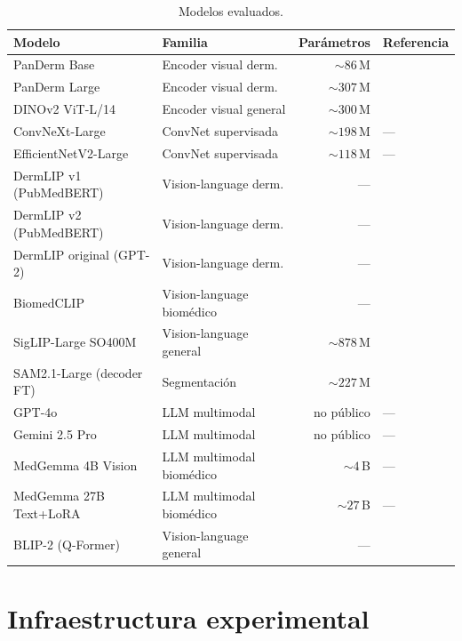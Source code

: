 \begin{table}[htbp]
\centering
\footnotesize
\setlength{\tabcolsep}{4pt}
\renewcommand{\arraystretch}{0.95}
\caption{Modelos evaluados.}
\label{tab:modelos}
\begin{tabular}{llrl}
\hline
Modelo & Familia & Parámetros & Referencia \\
\hline
PanDerm Base                & Encoder visual derm.       & $\sim 86$\,M & \cite{panderm2025} \\
PanDerm Large               & Encoder visual derm.       & $\sim 307$\,M & \cite{panderm2025} \\
DINOv2 ViT-L/14             & Encoder visual general     & $\sim 300$\,M & \cite{dinov2} \\
ConvNeXt-Large              & ConvNet supervisada        & $\sim 198$\,M & --- \\
EfficientNetV2-Large        & ConvNet supervisada        & $\sim 118$\,M & --- \\
DermLIP v1 (PubMedBERT)     & Vision-language derm.      & --- & \cite{derm1m} \\
DermLIP v2 (PubMedBERT)     & Vision-language derm.      & --- & \cite{derm1m} \\
DermLIP original (GPT-2)    & Vision-language derm.      & --- & \cite{derm1m} \\
BiomedCLIP                  & Vision-language biomédico  & --- & \cite{biomedclip} \\
SigLIP-Large SO400M         & Vision-language general    & $\sim 878$\,M & \cite{siglip2023} \\
SAM2.1-Large (decoder FT)   & Segmentación               & $\sim 227$\,M & \cite{sam2} \\
GPT-4o                      & LLM multimodal             & no público & --- \\
Gemini 2.5 Pro              & LLM multimodal             & no público & --- \\
MedGemma 4B Vision          & LLM multimodal biomédico   & $\sim 4$\,B & --- \\
MedGemma 27B Text+LoRA      & LLM multimodal biomédico   & $\sim 27$\,B & --- \\
BLIP-2 (Q-Former)           & Vision-language general    & --- & \cite{blip2_2023} \\
\hline
\end{tabular}
\end{table}

\section{Infraestructura experimental}
\label{sec:infraestructura}

